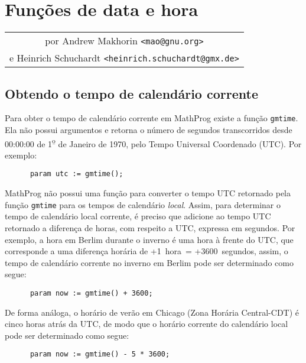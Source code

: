 \documentclass[11pt, brazil]{report}
\begin{document}

\chapter{Funções de data e hora}

\noindent\hfil
\begin{tabular}{c}
por Andrew Makhorin \verb|<mao@gnu.org>|\\
e Heinrich Schuchardt \verb|<heinrich.schuchardt@gmx.de>|\\
\end{tabular}

\section{Obtendo o tempo de calendário corrente}
\label{gmtime}

Para obter o tempo de calendário corrente em MathProg existe a função
{\tt gmtime}. Ela não possui argumentos e retorna o número de segundos
transcorridos desde 00:00:00 de 1{\textsuperscript{\b{o}}}
de Janeiro de 1970, pelo
Tempo Universal Coordenado (UTC). Por exemplo:

\begin{verbatim}
      param utc := gmtime();
\end{verbatim}

MathProg não possui uma função para converter o tempo UTC retornado pela função
{\tt gmtime} para os tempos de calendário {\it local}. Assim, para
determinar o tempo de calendário local corrente, é preciso que adicione ao
tempo UTC retornado a diferença de horas, com respeito a UTC, expressa em
segundos. Por exemplo, a hora em Berlim durante o inverno é uma hora à frente
do UTC, que corresponde a uma diferença horária de +1~hora~= +3600~segundos,
assim, o tempo de calendário corrente no inverno em Berlim pode ser determinado
como segue:

\begin{verbatim}
      param now := gmtime() + 3600;
\end{verbatim}

\noindent De forma análoga, o horário de verão em Chicago (Zona Horária Central-CDT)
é cinco horas atrás da UTC, de modo que o horário corrente do calendário local
pode ser determinado como segue:

\begin{verbatim}
      param now := gmtime() - 5 * 3600;
\end{verbatim}
\end{document}
